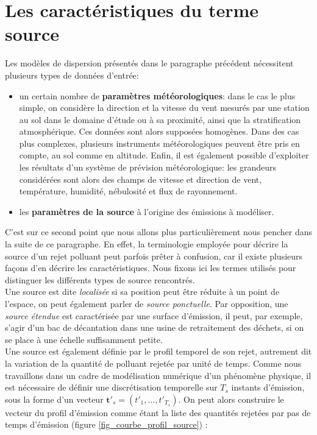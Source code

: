 	
	\section{Les caractéristiques du terme source}
	
	Les modèles de dispersion présentés dans le paragraphe précédent nécessitent plusieurs types de données d'entrée: 
	\begin{itemize}
		\item un certain nombre de \textbf{paramètres météorologiques}: dans le cas le plus simple, on considère la direction et la vitesse du vent mesurés par une station au sol dans le domaine d'étude ou à sa proximité, ainsi que la stratification atmosphérique. Ces données sont alors supposées homogènes. Dans des cas plus complexes, plusieurs instruments météorologiques peuvent être pris en compte, au sol comme en altitude. Enfin, il est également possible d'exploiter les résultats d'un système de prévision météorologique: les grandeurs considérées sont alors des champs de vitesse et direction de vent, température, humidité, nébulosité et flux de rayonnement.
		\item les \textbf{paramètres de la source} à l'origine des émissions à modéliser.
	\end{itemize}
	
	C'est sur ce second point que nous allons plus particulièrement nous pencher dans la suite de ce paragraphe. En effet, la terminologie employée pour décrire la source d'un rejet polluant peut parfois prêter à confusion, car il existe plusieurs façons d'en décrire les caractéristiques. Nous fixons ici les termes utilisés pour distinguer les différents types de source rencontrés.\\
	
	Une source est dite \textit{localisée} si sa position peut être réduite à un point de l'espace, on peut également parler de \textit{source ponctuelle}. Par opposition, une \textit{source étendue} est caractérisée par une surface d'émission, il peut, par exemple, s'agir d'un bac de décantation dans une usine de retraitement des déchets, si on se place à une échelle suffisamment petite.\\
	
	Une source est également définie par le profil temporel de son rejet, autrement dit la variation de la quantité de polluant rejetée par unité de temps. Comme nous travaillons dans un cadre de modélisation numérique d'un phénomène physique, il est nécessaire de définir une discrétisation temporelle sur $T_s$ instants d'émission, sous la forme d'un vecteur $\bm{t'}_s = (t'_1, \dots, t'_{T_s})$. On peut alors construire le vecteur du profil d'émission comme étant la liste des quantités rejetées par pas de temps d'émission (figure \ref{fig_courbe_profil_source}) : 
	
